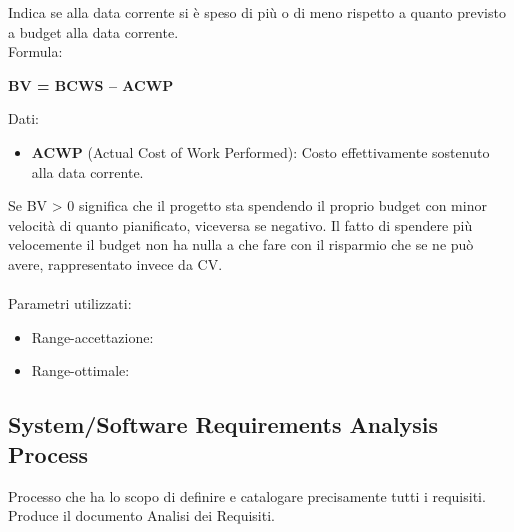 \documentclass[a4paper,11pt]{article}
\begin{document}
 Indica se alla data corrente si è speso di più o di meno rispetto a quanto previsto a budget alla data corrente.\\
Formula: 
\begin{center}
\textbf{BV = BCWS – ACWP}
\end{center}
Dati:
\begin{itemize}
\item \textbf{ACWP} (Actual Cost of Work Performed): Costo effettivamente sostenuto alla data corrente.
\end{itemize}
Se BV > 0 significa che il progetto sta spendendo il proprio budget con minor velocità di quanto pianificato, viceversa se negativo. Il fatto di spendere più velocemente il budget non ha nulla a che fare con il risparmio che se ne può avere, rappresentato invece da CV.\\\\
Parametri utilizzati: 
\begin{itemize}
	\item Range-accettazione: \begin{math}[ \ge -(PreventivoFase*10\%)]
	\end{math}
	\item Range-ottimale: \begin{math}[ \ge 0]\end{math}
	\end{itemize}
	
	

\subsection{System/Software Requirements Analysis Process}
Processo che ha lo scopo di definire e catalogare precisamente tutti i requisiti. Produce il documento Analisi dei Requisiti. 
\end{document}
